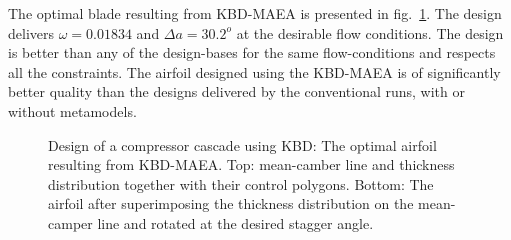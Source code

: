 The optimal blade resulting from KBD-MAEA is presented in fig.\ \ref{CBRDrelaRes}. The design delivers $\omega\!=\!0.01834$ and $\Delta a\!=\!30.2^o$ at the desirable flow conditions. The design is better than any of the design-bases for the same flow-conditions and respects all the constraints. The airfoil designed using the KBD-MAEA is of significantly better quality than the designs delivered by the conventional runs, with or without metamodels. 

\begin{figure}[h!]
\begin{minipage}[b]{1\linewidth}
 \centering
\end{minipage}
\caption{Design of a compressor cascade using KBD: The optimal airfoil resulting from KBD-MAEA. Top: mean-camber line and thickness distribution together with their control polygons. Bottom: The airfoil after superimposing the thickness distribution on the mean-camper line and rotated at the desired stagger angle.} 
\label{CBRDrelaRes}
\end{figure}



%
